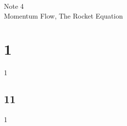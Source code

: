 \documentclass[12pt]{article}
\begin{document}
\normalfont
\pagestyle{pages}


\begin{center}
\vspace{3in}
{\Large Note 4 } \\[0.05in]
Momentum Flow, The Rocket Equation \\ [0.5in]
\end{center}


\section{1}
1

\subsection{11}

1
\end{document}

